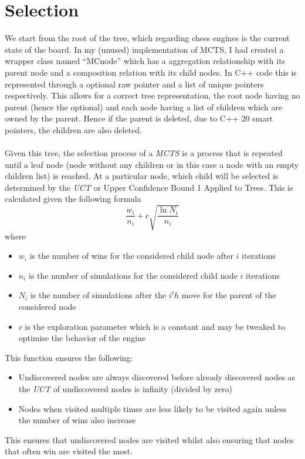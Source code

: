 \section{Selection}
We start from the root of the tree, which regarding chess engines is the current state of the board. In my (unused) implementation of MCTS, I had created a wrapper class named ``MCnode'' which has a aggregation relationship with its parent node and a composition relation with its child nodes. In C++ code this is represented through a optional raw pointer and a list of unique pointers respectively. This allows for a correct tree representation, the root node having no parent (hence the optional) and each node having a list of children which are owned by the parent. Hence if the parent is deleted, due to C++ 20 smart pointers, the children are also deleted.\\\\
Given this tree, the selection process of a \textit{MCTS} is a process that is repeated until a leaf node (node without any children or in this case a node with an empty children list) is reached. At a particular node, which child will be selected is determined by the \textit{UCT} or Upper Confidence Bound 1 Applied to Trees. This is calculated given the following formula \[\frac{w_i}{n_i} + c\sqrt{\frac{\ln{N_i}}{n_i}}\] where \begin{itemize}
    \item $w_i$ is the number of wins for the considered child node after $i$ iterations
    \item $n_i$ is the number of simulations for the considered child node $i$ iterations
    \item $N_i$ is the number of simulations after the $i^th$ move for the parent of the considered node
    \item $c$ is the exploration parameter which is a constant and may be tweaked to optimise the behavior of the engine
\end{itemize}
This function ensures the following:
\begin{itemize}
    \item Undiscovered nodes are always discovered before already discovered nodes as the \textit{UCT} of undiscovered nodes is infinity (divided by zero)
    \item Nodes when visited multiple times are less likely to be visited again unless the number of wins also increase
\end{itemize}
This ensures that undiscovered nodes are visited whilst also ensuring that nodes that often win are visited the most.
